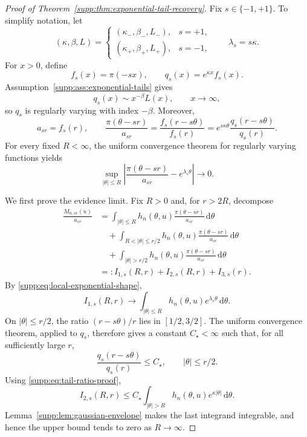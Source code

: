\documentclass[numsec,webpdf,modern,medium,namedate]{oup-authoring-template}
\theoremstyle{thmstyleone}
\theoremstyle{thmstyletwo}
\newcommand{\dd}{\mathrm{d}}
\begin{document}
\begin{proof}[Proof of Theorem~\ref{supp:thm:exponential-tail-recovery}]
Fix $s\in\{-1,+1\}$.  To simplify notation, let
\[
  (\kappa,\beta,L)
  =
  \begin{cases}
    (\kappa_-,\beta_-,L_-), &s=+1,\\
    (\kappa_+,\beta_+,L_+), &s=-1,
  \end{cases}
  \qquad
  \lambda_s=s\kappa.
\]
For $x>0$, define
\[
  f_s(x)=\pi(-sx),
  \qquad
  q_s(x)=e^{\kappa x}f_s(x).
\]
Assumption~\ref{supp:ass:exponential-tails} gives
\[
  q_s(x)\sim x^{-\beta}L(x),
  \qquad x\to\infty,
\]
so $q_s$ is regularly varying with index $-\beta$.  Moreover,
\begin{equation}
\label{supp:eq:tail-ratio-proof}
  a_{sr}=f_s(r),
  \qquad
  \frac{\pi(\theta-sr)}{a_{sr}}
  =
  \frac{f_s(r-s\theta)}{f_s(r)}
  =
  e^{s\kappa\theta}
  \frac{q_s(r-s\theta)}{q_s(r)}.
\end{equation}
For every fixed $R<\infty$, the uniform convergence theorem for
regularly varying functions \citep[Theorem~1.2.1]{Bingham1987} yields
\begin{equation}
\label{supp:eq:local-exponential-shape}
  \sup_{|\theta|\leq R}
  \left|
    \frac{\pi(\theta-sr)}{a_{sr}}
    -e^{\lambda_s\theta}
  \right|
  \longrightarrow0.
\end{equation}

We first prove the evidence limit.  Fix $R>0$ and, for $r>2R$,
decompose
\begin{align}
  \frac{M_{n,sr}(u)}{a_{sr}}
  &={}
  \int_{|\theta|\leq R}
    h_n(\theta,u)
    \frac{\pi(\theta-sr)}{a_{sr}}\,\dd\theta
  \nonumber\\
  &\quad+
  \int_{R<|\theta|\leq r/2}
    h_n(\theta,u)
    \frac{\pi(\theta-sr)}{a_{sr}}\,\dd\theta
  \nonumber\\
  &\quad+
  \int_{|\theta|>r/2}
    h_n(\theta,u)
    \frac{\pi(\theta-sr)}{a_{sr}}\,\dd\theta
  \nonumber\\
  &=:
  I_{1,s}(R,r)+I_{2,s}(R,r)+I_{3,s}(r).
\label{supp:eq:three-part-decomposition}
\end{align}
By \eqref{supp:eq:local-exponential-shape},
\begin{equation}
\label{supp:eq:I1-limit}
  I_{1,s}(R,r)
  \longrightarrow
  \int_{|\theta|\leq R}
    h_n(\theta,u)e^{\lambda_s\theta}\,\dd\theta.
\end{equation}
On $|\theta|\leq r/2$, the ratio $(r-s\theta)/r$ lies in
$[1/2,3/2]$.  The uniform convergence theorem, applied to $q_s$,
therefore gives a constant $C_\star<\infty$ such that, for all
sufficiently large $r$,
\[
  \frac{q_s(r-s\theta)}{q_s(r)}
  \leq C_\star,
  \qquad |\theta|\leq r/2.
\]
Using \eqref{supp:eq:tail-ratio-proof},
\begin{equation}
\label{supp:eq:I2-bound}
  I_{2,s}(R,r)
  \leq
  C_\star
  \int_{|\theta|>R}
    h_n(\theta,u)e^{\kappa|\theta|}\,\dd\theta.
\end{equation}
Lemma~\ref{supp:lem:gaussian-envelope} makes the last integrand
integrable, and hence the upper bound tends to zero as $R\to\infty$.


\end{proof}
\end{document}
